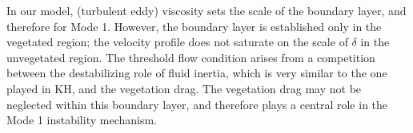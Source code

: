 \documentclass[12pt]{report}   %
\newcommand{\Rey}{{R}}
\newcommand{\Ndg}{\tilde{N}_g}
\begin{document}
In our model, (turbulent eddy) viscosity sets the scale of the boundary layer, and therefore for Mode 1.
However, the boundary layer is established only in the vegetated region; the velocity profile does not saturate on the scale of $\delta$ in the unvegetated region.
The threshold flow condition arises from a competition between the destabilizing role of fluid inertia, which is very similar to the one played in KH, and the vegetation drag.
The vegetation drag may not be neglected within this boundary layer, and therefore plays a central role in the Mode 1 instability mechanism.

\end{document}

